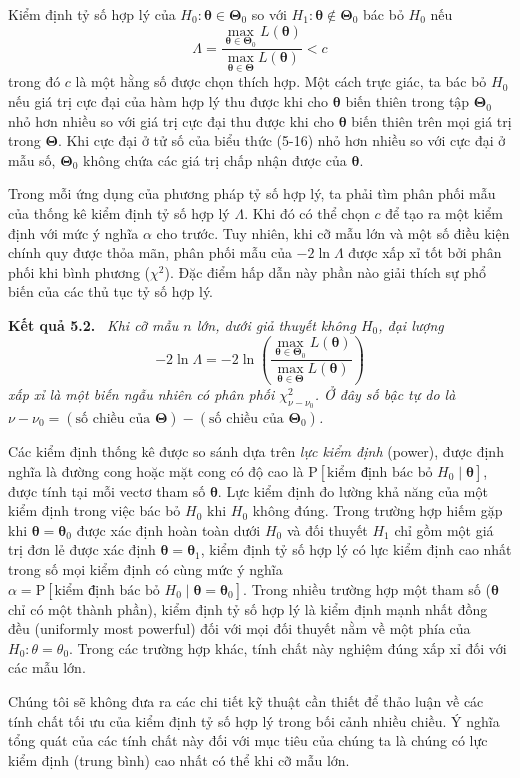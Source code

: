 Kiểm định tỷ số hợp lý của $H_0: \boldsymbol{\theta} \in \boldsymbol{\Theta}_0$ so với $H_1: \boldsymbol{\theta} \notin \boldsymbol{\Theta}_0$ bác bỏ $H_0$ nếu
\begin{equation}
\Lambda = \frac{\max\limits_{\boldsymbol{\theta} \in \boldsymbol{\Theta}_0} L(\boldsymbol{\theta})}{\max\limits_{\boldsymbol{\theta} \in \boldsymbol{\Theta}} L(\boldsymbol{\theta})} < c
\tag{5-16}
\end{equation}
trong đó $c$ là một hằng số được chọn thích hợp. Một cách trực giác, ta bác bỏ $H_0$ nếu giá trị cực đại của hàm hợp lý thu được khi cho $\boldsymbol{\theta}$ biến thiên trong tập $\boldsymbol{\Theta}_0$ nhỏ hơn nhiều so với giá trị cực đại thu được khi cho $\boldsymbol{\theta}$ biến thiên trên mọi giá trị trong $\boldsymbol{\Theta}$. Khi cực đại ở tử số của biểu thức (5-16) nhỏ hơn nhiều so với cực đại ở mẫu số, $\boldsymbol{\Theta}_0$ không chứa các giá trị chấp nhận được của $\boldsymbol{\theta}$.

Trong mỗi ứng dụng của phương pháp tỷ số hợp lý, ta phải tìm phân phối mẫu của thống kê kiểm định tỷ số hợp lý $\Lambda$. Khi đó có thể chọn $c$ để tạo ra một kiểm định với mức ý nghĩa $\alpha$ cho trước. Tuy nhiên, khi cỡ mẫu lớn và một số điều kiện chính quy được thỏa mãn, phân phối mẫu của $-2\ln\Lambda$ được xấp xỉ tốt bởi phân phối khi bình phương ($\chi^2$). Đặc điểm hấp dẫn này phần nào giải thích sự phổ biến của các thủ tục tỷ số hợp lý.

\par\medskip\noindent\textbf{Kết quả 5.2.}\ \itshape
Khi cỡ mẫu $n$ lớn, dưới giả thuyết không $H_0$, đại lượng
\begin{equation*}
-2 \ln \Lambda = -2 \ln \left( \frac{\max\limits_{\boldsymbol{\theta} \in \boldsymbol{\Theta}_0} L(\boldsymbol{\theta})}{\max\limits_{\boldsymbol{\theta} \in \boldsymbol{\Theta}} L(\boldsymbol{\theta})} \right)
\end{equation*}
xấp xỉ là một biến ngẫu nhiên có phân phối $\chi^2_{\nu-\nu_0}$. Ở đây số bậc tự do là $\nu-\nu_0=(\text{số chiều của }\boldsymbol{\Theta})-(\text{số chiều của }\boldsymbol{\Theta}_0)$.
\upshape\par\medskip

Các kiểm định thống kê được so sánh dựa trên \emph{lực kiểm định} (power), được định nghĩa là đường cong hoặc mặt cong có độ cao là $\mathrm{P}[\text{kiểm định bác bỏ } H_0 \mid \boldsymbol{\theta}]$, được tính tại mỗi vectơ tham số $\boldsymbol{\theta}$. Lực kiểm định đo lường khả năng của một kiểm định trong việc bác bỏ $H_0$ khi $H_0$ không đúng. Trong trường hợp hiếm gặp khi $\boldsymbol{\theta}=\boldsymbol{\theta}_0$ được xác định hoàn toàn dưới $H_0$ và đối thuyết $H_1$ chỉ gồm một giá trị đơn lẻ được xác định $\boldsymbol{\theta}=\boldsymbol{\theta}_1$, kiểm định tỷ số hợp lý có lực kiểm định cao nhất trong số mọi kiểm định có cùng mức ý nghĩa $\alpha=\mathrm{P}[\text{kiểm định bác bỏ } H_0\mid\boldsymbol{\theta}=\boldsymbol{\theta}_0]$. Trong nhiều trường hợp một tham số ($\boldsymbol{\theta}$ chỉ có một thành phần), kiểm định tỷ số hợp lý là kiểm định mạnh nhất đồng đều (uniformly most powerful) đối với mọi đối thuyết nằm về một phía của $H_0: \theta = \theta_0$. Trong các trường hợp khác, tính chất này nghiệm đúng xấp xỉ đối với các mẫu lớn.

Chúng tôi sẽ không đưa ra các chi tiết kỹ thuật cần thiết để thảo luận về các tính chất tối ưu của kiểm định tỷ số hợp lý trong bối cảnh nhiều chiều. Ý nghĩa tổng quát của các tính chất này đối với mục tiêu của chúng ta là chúng có lực kiểm định (trung bình) cao nhất có thể khi cỡ mẫu lớn.